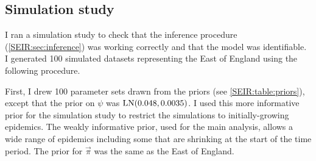 \documentclass[thesis.tex]{subfiles}
\begin{document}
\subsection{Simulation study} \label{SEIR:sec:sim-study}

I ran a simulation study to check that the inference procedure (\cref{SEIR:sec:inference}) was working correctly and that the model was identifiable.
I generated 100 simulated datasets representing the East of England using the following procedure.

First, I drew 100 parameter sets drawn from the priors (see \cref{SEIR:table:priors}), except that the prior on $\psi$ was $\operatorname{LN}(0.048, 0.0035)$.
I used this more informative prior for the simulation study to restrict the simulations to initially-growing epidemics.
The weakly informative prior, used for the main analysis, allows a wide range of epidemics including some that are shrinking at the start of the time period.
The prior for $\vec{\pi}$ was the same as the East of England.
\end{document}
